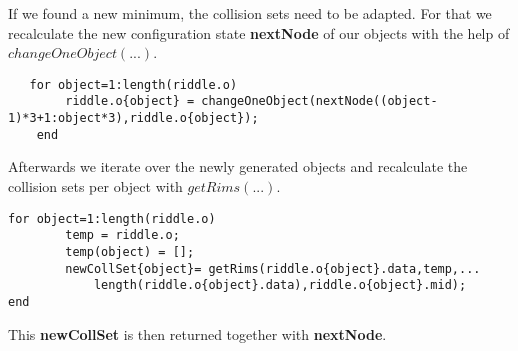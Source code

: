 If we found a new minimum, the collision sets need to be adapted. For that we recalculate the new configuration state \textbf{nextNode} of our objects with the help of $changeOneObject(...)$.
\begin{lstlisting}
   for object=1:length(riddle.o)
        riddle.o{object} = changeOneObject(nextNode((object-1)*3+1:object*3),riddle.o{object});    
    end
\end{lstlisting}
Afterwards we iterate over the newly generated objects and recalculate the collision sets per object with $getRims(...)$.
\begin{lstlisting}
for object=1:length(riddle.o)
        temp = riddle.o;
        temp(object) = [];
        newCollSet{object}= getRims(riddle.o{object}.data,temp,...
            length(riddle.o{object}.data),riddle.o{object}.mid);
end
\end{lstlisting}
This \textbf{newCollSet} is then returned together with \textbf{nextNode}.


